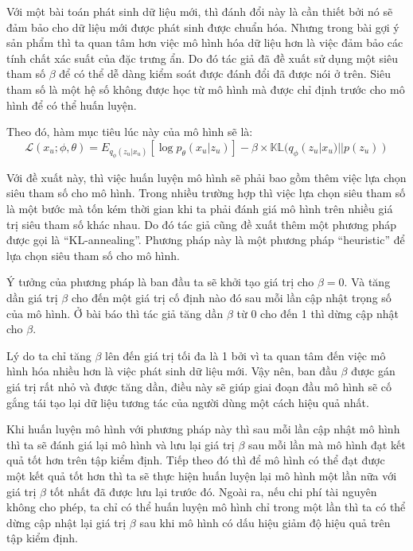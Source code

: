     Với một bài toán phát sinh dữ liệu mới, thì đánh đổi này là cần thiết bởi nó sẽ đảm bảo cho dữ liệu mới được phát sinh được chuẩn hóa.
    Nhưng trong bài gợi ý sản phẩm thì ta quan tâm hơn việc mô hình hóa dữ liệu hơn là việc đảm bảo các tính chất xác suất của đặc trưng ẩn.
    Do đó tác giả đã đề xuất sử dụng một siêu tham số $\beta$ để có thể dễ dàng kiểm soát được đánh đổi đã được nói ở trên. 
    Siêu tham số là một hệ số không được học từ mô hình mà được chỉ định trước cho mô hình để có thể huấn luyện.
    
    Theo đó, hàm mục tiêu lúc này của mô hình sẽ là:
    \begin{equation}
        \label{elbo_betamvae}
        \mathcal{L}(x_u;\phi,\theta) = E_{q_\phi(z_u|x_u)}[\log p_\theta(x_u|z_u)] - \beta \times \mathbb{KL}(q_\phi(z_u|x_u) || p(z_u))
    \end{equation}

    Với đề xuất này, thì việc huấn luyện mô hình sẽ phải bao gồm thêm việc lựa chọn siêu tham số cho mô hình.
    Trong nhiều trường hợp thì việc lựa chọn siêu tham số là một bước mà tốn kém thời gian khi ta phải đánh giá mô hình trên nhiều giá trị siêu tham số khác nhau.  
    Do đó tác giả cũng đề xuất thêm một phương pháp được gọi là ``KL-annealing''.
    Phương pháp này là một phương pháp ``heuristic'' để lựa chọn siêu tham số cho mô hình.

    Ý tưởng của phương pháp là ban đầu ta sẽ khởi tạo giá trị cho $\beta =0$.
    Và tăng dần giá trị $\beta$ cho đến một giá trị cố định nào đó sau mỗi lần cập nhật trọng số của mô hình.
    Ở bài báo \cite{mvae} thì tác giả tăng dần $\beta$ từ 0 cho đến 1 thì dừng cập nhật cho $\beta$.

    Lý do ta chỉ tăng $\beta$ lên đến giá trị tối đa là 1 bởi vì ta quan tâm đến việc mô hình hóa nhiều hơn là việc phát sinh dữ liệu mới.
    Vậy nên, ban đầu $\beta$ được gán giá trị rất nhỏ và được tăng dần, điều này sẽ giúp giai đoạn đầu mô hình sẽ cố gắng tái tạo lại dữ liệu tương tác của người dùng một cách hiệu quả nhất.

    Khi huấn luyện mô hình với phương pháp này thì sau mỗi lần cập nhật mô hình thì ta sẽ đánh giá lại mô hình và lưu lại giá trị $\beta$ sau mỗi lần mà mô hình đạt kết quả tốt hơn trên tập kiểm định.
    Tiếp theo đó thì để mô hình có thể đạt được một kết quả tốt hơn thì ta sẽ thực hiện huấn luyện lại mô hình một lần nữa với giá trị $\beta$ tốt nhất đã được lưu lại trước đó.  Ngoài ra, nếu chi phí tài nguyên không cho phép, ta chỉ có thể huấn luyện mô hình chỉ trong một lần thì ta có thể dừng cập nhật lại giá trị $\beta$ sau khi mô hình có dấu hiệu giảm độ hiệu quả trên tập kiểm định. 
